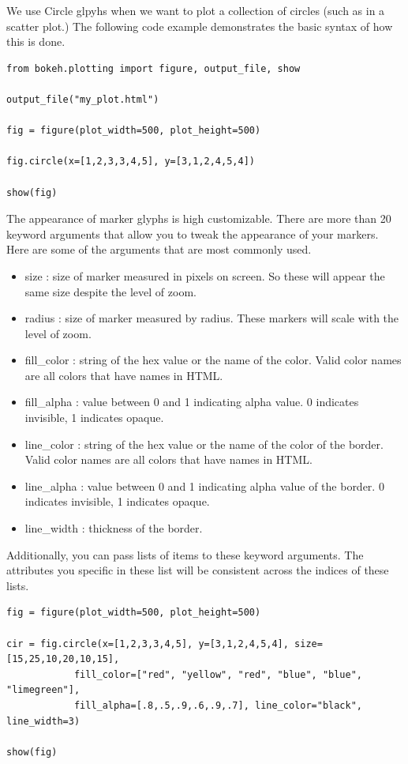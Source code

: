 We use Circle glpyhs when we want to plot a collection of circles (such as in
a scatter plot.) The following code example demonstrates the basic syntax of
how this is done.

\begin{lstlisting}
from bokeh.plotting import figure, output_file, show

output_file("my_plot.html")

fig = figure(plot_width=500, plot_height=500)

fig.circle(x=[1,2,3,3,4,5], y=[3,1,2,4,5,4])

show(fig)
\end{lstlisting}

The appearance of marker glyphs is high customizable. There are more than 20 keyword
arguments that allow you to tweak the appearance of your markers. Here are some
of the arguments that are most commonly used.

\begin{itemize}
    \item size : size of marker measured in pixels on screen. So these will
        appear the same size despite the level of zoom.
    \item radius : size of marker measured by radius. These markers will scale
        with the level of zoom.
    \item fill\_color : string of the hex value or the name of the
        color. Valid color names are all colors that have names in HTML.
    \item fill\_alpha : value between 0 and 1 indicating alpha value. 0 indicates
        invisible, 1 indicates opaque.
    \item line\_color : string of the hex value or the name of the
        color of the border. Valid color names are all colors that have
        names in HTML.
    \item line\_alpha : value between 0 and 1 indicating alpha value of the
        border. 0 indicates invisible, 1 indicates opaque.
    \item line\_width : thickness of the border.
\end{itemize}

Additionally, you can pass lists of items to these keyword arguments. The
attributes you specific in these list will be consistent across the indices of
these lists.

\begin{lstlisting}
fig = figure(plot_width=500, plot_height=500)

cir = fig.circle(x=[1,2,3,3,4,5], y=[3,1,2,4,5,4], size=[15,25,10,20,10,15],
            fill_color=["red", "yellow", "red", "blue", "blue", "limegreen"],
            fill_alpha=[.8,.5,.9,.6,.9,.7], line_color="black", line_width=3)

show(fig)
\end{lstlisting}

